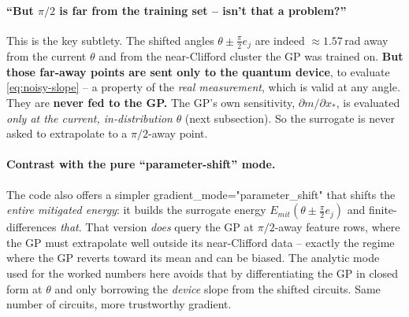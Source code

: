 \documentclass[11pt]{article}
\def\bm#1{#1}%
\def\texttt#1{#1}%
\def\mathrm#1{#1}%
\newcommand{\Emit}{E_{\mathrm{mit}}}
\begin{document}
\paragraph{``But $\pi/2$ is far from the training set -- isn't that a problem?''}
This is the key subtlety. The shifted angles
$\bm\theta\pm\tfrac\pi2\bm e_j$ are indeed $\approx1.57$\,rad away from the current
$\bm\theta$ and from the near-Clifford cluster the GP was trained on. \textbf{But
those far-away points are sent only to the quantum device}, to evaluate
\eqref{eq:noisy-slope} -- a property of the \emph{real measurement}, which is
valid at any angle. They are \textbf{never fed to the GP.} The GP's own
sensitivity, $\partial m/\partial\bm x_*$, is evaluated \emph{only at the current,
in-distribution} $\bm\theta$ (next subsection). So the surrogate is never asked to
extrapolate to a $\pi/2$-away point.

\paragraph{Contrast with the pure ``parameter-shift'' mode.} The code also offers
a simpler \texttt{gradient\_mode="parameter\_shift"} that shifts the
\emph{entire mitigated energy}: it builds the surrogate energy
$\Emit(\bm\theta\pm\tfrac\pi2\bm e_j)$ and finite-differences \emph{that}. That
version \emph{does} query the GP at $\pi/2$-away feature rows, where the GP must
extrapolate well outside its near-Clifford data -- exactly the regime where the
GP reverts toward its mean and can be biased. The \texttt{analytic} mode used for
the worked numbers here avoids that by differentiating the GP in closed form at
$\bm\theta$ and only borrowing the \emph{device} slope from the shifted circuits.
Same number of circuits, more trustworthy gradient.
\end{document}
